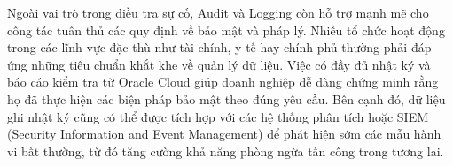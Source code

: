 \begin{myitem}
\begin{mysubitem}
        \item Ngoài vai trò trong điều tra sự cố, Audit và Logging còn hỗ trợ mạnh mẽ cho công tác tuân thủ các quy định về bảo mật và pháp lý. Nhiều tổ chức hoạt động trong các lĩnh vực đặc thù như tài chính, y tế hay chính phủ thường phải đáp ứng những tiêu chuẩn khắt khe về quản lý dữ liệu. Việc có đầy đủ nhật ký và báo cáo kiểm tra từ Oracle Cloud giúp doanh nghiệp dễ dàng chứng minh rằng họ đã thực hiện các biện pháp bảo mật theo đúng yêu cầu. Bên cạnh đó, dữ liệu ghi nhật ký cũng có thể được tích hợp với các hệ thống phân tích hoặc SIEM (Security Information and Event Management) để phát hiện sớm các mẫu hành vi bất thường, từ đó tăng cường khả năng phòng ngừa tấn công trong tương lai.
    \end{mysubitem}
    
\end{myitem}

